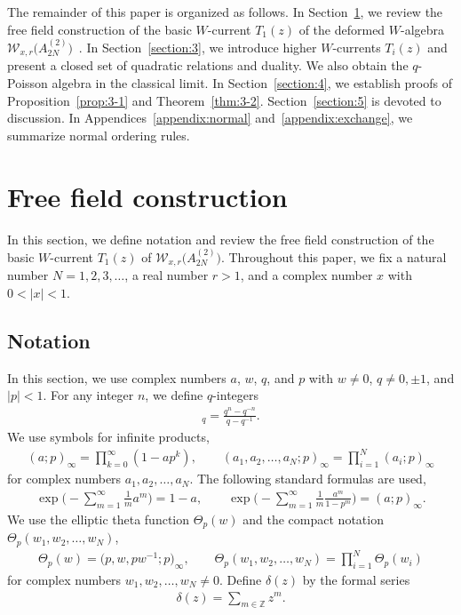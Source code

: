 \documentclass[10pt,a4paper]{amsart}
\numberwithin{equation}{section}
\begin{document}
The remainder of this paper is organized as follows.
In Section~\ref{section:2}, we review
the free field construction of the basic $W$-current $T_1(z)$ of
the deformed $W$-algebra ${\mathcal W}_{x,r}\bigl(A_{2N}^{(2)}\bigr)$~\cite{Frenkel-Reshetikhin1}.
In Section~\ref{section:3},
we introduce higher $W$-currents $T_i(z)$ and present a closed set of quadratic relations and duality.
We also obtain the $q$-Poisson algebra in the classical limit.
In Section~\ref{section:4}, we establish
proofs of Proposition~\ref{prop:3-1} and Theorem~\ref{thm:3-2}.
Section~\ref{section:5} is devoted to discussion.
In Appendices~\ref{appendix:normal} and~\ref{appendix:exchange},
we summarize normal ordering rules.

\section{Free field construction}
\label{section:2}

In this section, we define notation and review the free field construction
of the basic $W$-current $T_1(z)$ of ${\mathcal W}_{x,r}\bigl(A_{2N}^{(2)}\bigr)$.
Throughout this paper, we fix a natural number $N=1,2,3,\dots$,
a real number $r>1$, and a complex number $x$ with $0<|x|<1$.

\subsection{Notation}

In this section, we use complex numbers $a$, $w$, $q$, and $p$
with $w\neq 0$, $q \neq 0,\pm1$, and $|p|<1$. For any integer $n$, we define $q$-integers
\begin{gather*}
[n]_q=\frac{q^n-q^{-n}}{q-q^{-1}}.
\end{gather*}
We {use} symbols for infinite products,
\begin{gather*}
(a;p)_\infty=\prod_{k=0}^\infty (1-a p^k),\qquad
(a_1,a_2, \dots, a_N; p)_\infty=\prod_{i=1}^N (a_i; p)_\infty
\end{gather*}
for complex numbers $a_1, a_2, \dots, a_N$.
The following standard formulas are used,
\begin{gather*}
\exp\Biggl({-}\sum_{m=1}^\infty \frac{1}{m}a^m \Biggr)=1-a,\qquad
\exp\Biggl({-}\sum_{m=1}^\infty \frac{1}{m}\frac{a^m}{1-p^m}\Biggr)=(a;p)_\infty.
\end{gather*}
We use the elliptic theta function $\Theta_p(w)$ and the compact notation $\Theta_p(w_1,w_2, \dots, w_N)$,
\begin{gather*}
\Theta_p(w)=\big(p, w, p w^{-1};p\big)_\infty,\qquad
\Theta_p (w_1, w_2, \dots, w_N)=\prod_{i=1}^N \Theta_p(w_i)
\end{gather*}
for complex numbers $w_1, w_2, \dots, w_N \neq 0$. Define
$\delta(z)$ by the formal series
\begin{gather*}
\delta(z)=\sum_{m \in \mathbb{Z}}z^m.
\end{gather*}
\end{document}
